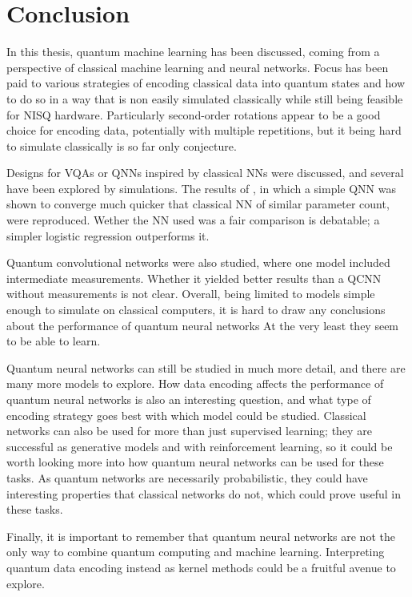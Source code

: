 \chapter{Conclusion}
\label{chap:conclusion}
In this thesis, quantum machine learning has been discussed, coming from a perspective of classical machine learning and neural networks.
Focus has been paid to various strategies of encoding classical data into quantum states and how to do so in a way that is non easily simulated classically while still being feasible for NISQ hardware.
Particularly second-order rotations appear to be a good choice for encoding data, potentially with multiple repetitions, but it being hard to simulate classically is so far only conjecture.

Designs for VQAs or QNNs inspired by classical NNs were discussed, and several have been explored by simulations.
The results of \cite{abbas2021}, in which a simple QNN was shown to converge much quicker that classical NN of similar parameter count, were reproduced.
Wether the NN used was a fair comparison is debatable; a simpler logistic regression outperforms it.

Quantum convolutional networks were also studied, where one model included intermediate measurements.
Whether it yielded better results than a QCNN without measurements is not clear.
Overall, being limited to models simple enough to simulate on classical computers, it is hard to draw any conclusions about the performance of quantum neural networks
At the very least they seem to be able to learn.

Quantum neural networks can still be studied in much more detail, and there are many more models to explore.
How data encoding affects the performance of quantum neural networks is also an interesting question, and what type of encoding strategy goes best with which model could be studied.
Classical networks can also be used for more than just supervised learning; they are successful as generative models and with reinforcement learning, so it could be worth looking more into how quantum neural networks can be used for these tasks.
As quantum networks are necessarily probabilistic, they could have interesting properties that classical networks do not, which could prove useful in these tasks.

Finally, it is important to remember that quantum neural networks are not the only way to combine quantum computing and machine learning.
Interpreting quantum data encoding instead as kernel methods could be a fruitful avenue to explore.

